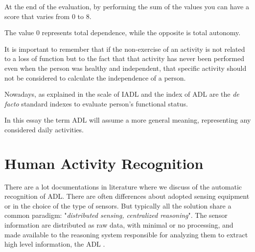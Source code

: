 \documentclass{thesisreport}
\begin{document}


At the end of the evaluation, by performing the sum of the values you can have a score that varies from 0 to 8.

The value 0 represents total dependence, while the opposite is total autonomy.

It is important to remember that if the non-exercise of an activity is not related to a loss of function but to the fact that that activity has never been performed even when the person was healthy and independent, that specific activity should not be considered to calculate the independence of a person.


Nowadays, as explained in \cite{bruno2014public} the scale of IADL and the index of ADL are the \textit{de facto} standard indexes to evaluate person’s functional status\cite{buoncompagni2017towards}. 

In this essay the term ADL will assume a more general meaning, representing any  considered daily activities. 


\section{Human Activity Recognition}
There are a lot documentations in literature where we discuss of the automatic recognition of ADL. There are often differences about adopted sensing equipment or in the choice of the type of sensors. But typically all the solution share a common paradigm: "\textit{distributed sensing, centralized reasoning}". The sensor information are distributed as raw data, with minimal or no processing, and made available to the reasoning system responsible for analyzing them to extract high level information, the ADL \cite{buoncompagni2017towards}.   
\end{document}
